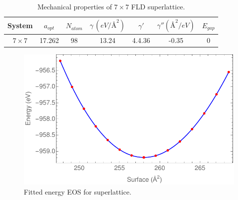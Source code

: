 \documentclass{article}
\begin{document}
\begin{table}[H]
  \centering
  \caption{Mechanical properties of $7\times7$ FLD superlattice.}
  \begin{tabular}{@{}ccccccc@{}}
  \toprule
  \textbf{System} & $a_{opt}$ & $N_{atom}$ & $\gamma \, (eV/\si{\angstrom}^2)$ & $\gamma'$ & $\gamma'' (\si{\angstrom}^2/ eV)$ & $E_{gap}$  \\ \midrule
  $7\times7$        & 17.262           & 98              & 13.24                  & 4.4.36             & -0.35  & 0              \\
  \end{tabular}
  \label{table:7_eos}
\end{table}
\begin{figure}[H]
  \centering
  \includegraphics[scale=0.5]{../figures/7_eos.pdf}  
  \caption{Fitted energy EOS for superlattice.}
  \label{fig:7x7_eos}
\end{figure}
\end{document}
